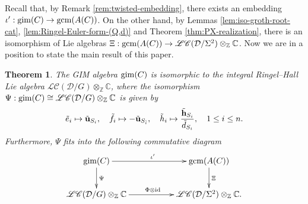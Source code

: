 \documentclass[12pt,reqno]{amsart}
\numberwithin{equation}{section}
\newcommand{\id}{\operatorname{id}\nolimits}
\newtheorem{theorem}{Theorem}[section]
\begin{document}
	Recall that, by Remark \ref{rem:twisted-embedding}, there exists an embedding $\iota':{\rm gim}(C)\rightarrow {\rm gcm}(A(C))$. On the other hand, by Lemmas \ref{lem:iso-groth-root-cat}, \ref{lem:Ringel-Euler-form-(Q,d)} and Theorem \ref{thm:PX-realization}, there is an isomorphism of Lie algebras $\Xi:{\rm gcm}(A(C))\rightarrow \mathscr{LC}(\mathcal{D}/\Sigma^2)\otimes_{\mathbb{Z}} \mathbb{C}$.
	Now we are in a position to state the main result of this paper.
	\begin{theorem}\label{thm:GIM-via-RH-Lie}
		The GIM algebra ${\rm gim}(C)$ is isomorphic to the integral Ringel--Hall Lie algebra $\mathscr{LC}(\mathcal{D}/G)\otimes_{\mathbb{Z}} \mathbb{C}$, where the isomorphism  $\Psi:{\rm gim}(C)\cong\mathscr{LC}(\mathcal{D}/G)\otimes_{\mathbb{Z}} \mathbb{C}$ is given by
		\[
		\tilde{e}_i\mapsto \tilde{\bf u}_{S_i},\quad \tilde{f}_i\mapsto -\tilde{\bf u}_{S_{\bar{i}}}, \quad\tilde{h}_i\mapsto \frac{\tilde{\bf h}_{S_i}}{\tilde{d}_{S_i}},\quad 1\leq i\leq n.
		\]
		Furthermore, $\Psi$ fits into the following commutative diagram
		\[
		\xymatrix{{\rm gim}(C)\ar[rr]^{\iota'}\ar[d]^{\Psi} &&{\rm gcm}(A(C))\ar[d]^{\Xi}\\
			\mathscr{LC}(\mathcal{D}/G)\otimes_{\mathbb{Z}} \mathbb{C}\ar[rr]^{\Phi\otimes \id}&&\mathscr{LC}(\mathcal{D}/\Sigma^2)\otimes_{\mathbb{Z}} \mathbb{C}.
		}
		\]
	\end{theorem}
\end{document}
